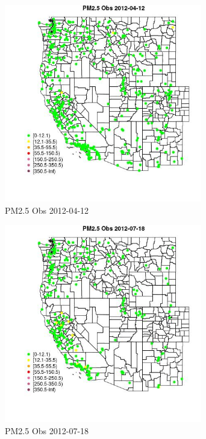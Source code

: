 \begin{figure} 
\centering  
\includegraphics[width=0.77\textwidth]{Code_Outputs/Report_ML_input_PM25_Step4_part_e_de_duplicated_aves_compiled_2019-05-14wNAs_MapObsPM25_Obs2012-04-12.jpg} 
\caption{\label{fig:Report_ML_input_PM25_Step4_part_e_de_duplicated_aves_compiled_2019-05-14wNAsMapObsPM25_Obs2012-04-12}PM2.5 Obs 2012-04-12} 
\end{figure} 
 

\begin{figure} 
\centering  
\includegraphics[width=0.77\textwidth]{Code_Outputs/Report_ML_input_PM25_Step4_part_e_de_duplicated_aves_compiled_2019-05-14wNAs_MapObsPM25_Obs2012-07-18.jpg} 
\caption{\label{fig:Report_ML_input_PM25_Step4_part_e_de_duplicated_aves_compiled_2019-05-14wNAsMapObsPM25_Obs2012-07-18}PM2.5 Obs 2012-07-18} 
\end{figure} 
 

